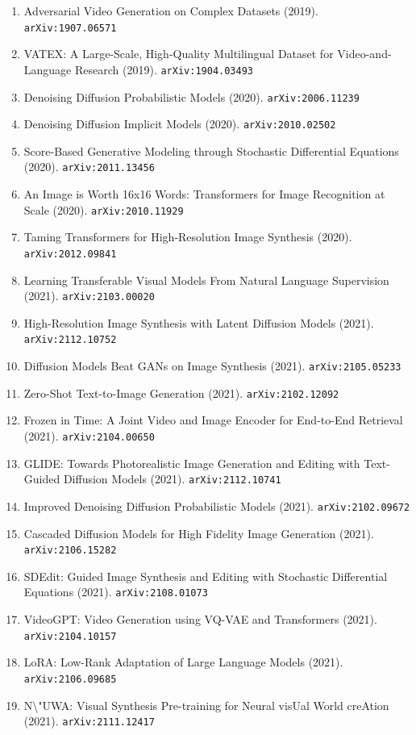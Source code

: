 \documentclass[11pt]{article}
\begin{document}
\begin{enumerate}
  \item Adversarial Video Generation on Complex Datasets (2019). \texttt{arXiv:1907.06571}
  \item VATEX: A Large-Scale, High-Quality Multilingual Dataset for
  Video-and-Language Research (2019). \texttt{arXiv:1904.03493}
  \item Denoising Diffusion Probabilistic Models (2020). \texttt{arXiv:2006.11239}
  \item Denoising Diffusion Implicit Models (2020). \texttt{arXiv:2010.02502}
  \item Score-Based Generative Modeling through Stochastic Differential
  Equations (2020). \texttt{arXiv:2011.13456}
  \item An Image is Worth 16x16 Words: Transformers for Image Recognition at
  Scale (2020). \texttt{arXiv:2010.11929}
  \item Taming Transformers for High-Resolution Image Synthesis (2020). \texttt{arXiv:2012.09841}
  \item Learning Transferable Visual Models From Natural Language Supervision (2021). \texttt{arXiv:2103.00020}
  \item High-Resolution Image Synthesis with Latent Diffusion Models (2021). \texttt{arXiv:2112.10752}
  \item Diffusion Models Beat GANs on Image Synthesis (2021). \texttt{arXiv:2105.05233}
  \item Zero-Shot Text-to-Image Generation (2021). \texttt{arXiv:2102.12092}
  \item Frozen in Time: A Joint Video and Image Encoder for End-to-End Retrieval (2021). \texttt{arXiv:2104.00650}
  \item GLIDE: Towards Photorealistic Image Generation and Editing with
  Text-Guided Diffusion Models (2021). \texttt{arXiv:2112.10741}
  \item Improved Denoising Diffusion Probabilistic Models (2021). \texttt{arXiv:2102.09672}
  \item Cascaded Diffusion Models for High Fidelity Image Generation (2021). \texttt{arXiv:2106.15282}
  \item SDEdit: Guided Image Synthesis and Editing with Stochastic Differential
  Equations (2021). \texttt{arXiv:2108.01073}
  \item VideoGPT: Video Generation using VQ-VAE and Transformers (2021). \texttt{arXiv:2104.10157}
  \item LoRA: Low-Rank Adaptation of Large Language Models (2021). \texttt{arXiv:2106.09685}
  \item N\textbackslash{}"UWA: Visual Synthesis Pre-training for Neural visUal World creAtion (2021). \texttt{arXiv:2111.12417}

\end{enumerate}
\end{document}
